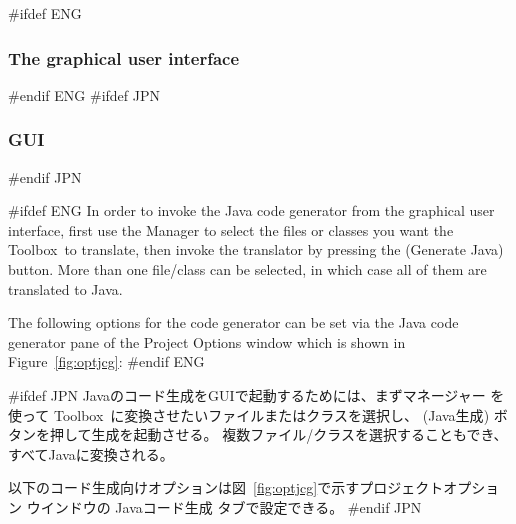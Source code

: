 \documentclass[\pformat,12pt]{article}
\newcommand{\Toolbox}{Toolbox}
\newcommand{\Toolbox}{Toolbox}
\newcommand{\guicmd}[1]{{\sf #1}}
\newcommand{\guicmd}[1]{{\gt #1}}
\begin{document}
#ifdef ENG
\subsubsection{The graphical user interface}
#endif ENG
#ifdef JPN
\subsubsection{GUI}
#endif JPN

#ifdef ENG
In order to invoke the Java code generator from the graphical user
interface, first use the \guicmd{Manager} to select the files or
classes you want
the \Toolbox\ to translate, then invoke the translator by pressing the 
(\guicmd{Generate Java}) button. More than one file/class can be
selected, in which case all of them are translated to Java.

The following options for the code generator can be set via the
\guicmd{Java code generator} pane of the \guicmd{Project Options} window
which is shown in Figure~\ref{fig:optjcg}:
#endif ENG

#ifdef JPN
Javaのコード生成をGUIで起動するためには、まず\guicmd{マネージャー} を使って
\Toolbox\ に変換させたいファイルまたはクラスを選択し、
(\guicmd{Java生成}) ボタンを押して生成を起動させる。
複数ファイル/クラスを選択することもでき、すべてJavaに変換される。

以下のコード生成向けオプションは図~\ref{fig:optjcg}で示す\guicmd{プロジェクトオプション} ウインドウの
\guicmd{Javaコード生成} タブで設定できる。
#endif JPN
\end{document}
